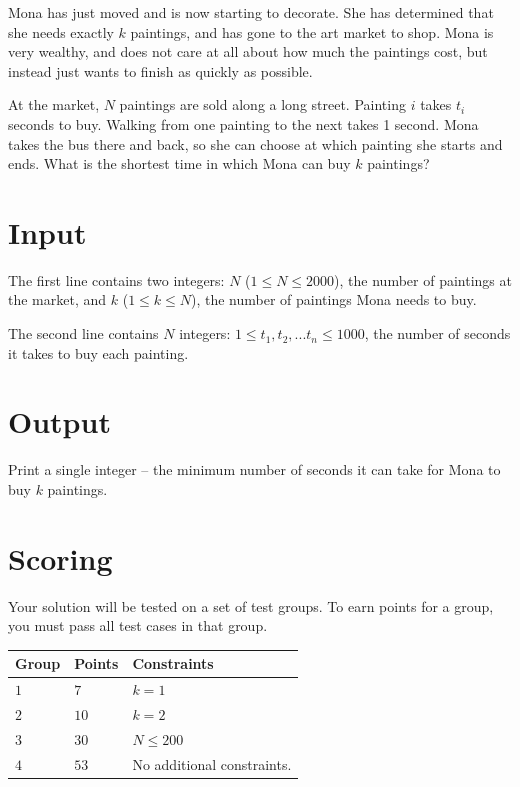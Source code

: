 Mona has just moved and is now starting to decorate. She has determined that she needs exactly $k$ paintings, and has gone to the art market to shop. Mona is very wealthy, and does not care at all about how much the paintings cost, but instead just wants to finish as quickly as possible.

At the market, $N$ paintings are sold along a long street. Painting $i$ takes $t_i$ seconds to buy. Walking from one painting to the next takes 1 second. Mona takes the bus there and back, so she can choose at which painting she starts and ends. What is the shortest time in which Mona can buy $k$ paintings?

\section*{Input}
The first line contains two integers: $N$ ($1 \le N \le 2000$), the number of paintings at the market, and $k$ ($1 \le k \le N$), the number of paintings Mona needs to buy.

The second line contains $N$ integers: $1 \le t_1,t_2,...t_n \le 1000$, the number of seconds it takes to buy each painting.

\section*{Output}
Print a single integer -- the minimum number of seconds it can take for Mona to buy $k$ paintings.

\section*{Scoring}
Your solution will be tested on a set of test groups.
To earn points for a group, you must pass all test cases in that group.

\noindent
\begin{tabular}{| l | l | l |}
  \hline
  Group & Points & Constraints \\ \hline
  $1$    & $7$        &  $k=1$ \\ \hline
  $2$    & $10$        &  $k=2$ \\ \hline
  $3$    & $30$        &  $N \le 200$ \\ \hline
  $4$    & $53$       &  No additional constraints. \\ \hline
\end{tabular}
